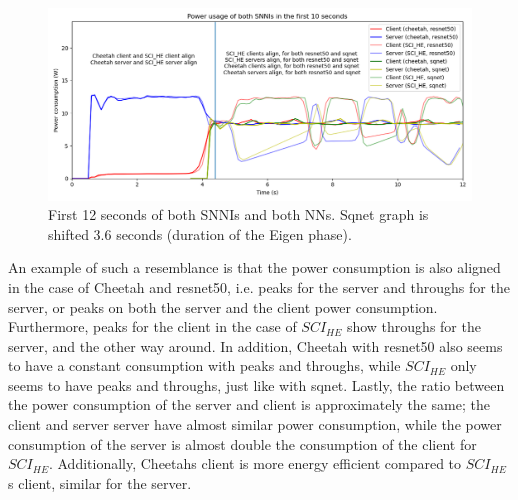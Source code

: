 \documentclass[../thesis.tex]{subfiles}
\begin{document}

\begin{figure}[ht]
    \centering
    \includegraphics[width=.8\linewidth]{Thesis/Images/mean_first10secs.png} 
    \caption{First 12 seconds of both SNNIs and both NNs. Sqnet graph is shifted 3.6 seconds (duration of the Eigen phase).}
    \label{fig:first10secs}
\end{figure}

An example of such a resemblance is that the power consumption is also aligned in the case of Cheetah and resnet50, i.e. peaks for the server and throughs for the server, or peaks on both the server and the client power consumption. Furthermore, peaks for the client in the case of $SCI_{HE}$ show throughs for the server, and the other way around. In addition, Cheetah with resnet50 also seems to have a constant consumption with peaks and throughs, while $SCI_{HE}$ only seems to have peaks and throughs, just like with sqnet. Lastly, the ratio between the power consumption of the server and client is approximately the same; the client and server server have almost similar power consumption, while the power consumption of the server is almost double the consumption of the client for $SCI_{HE}$. Additionally, Cheetahs client is more energy efficient compared to $SCI_{HE}$s client, similar for the server.
\end{document}
